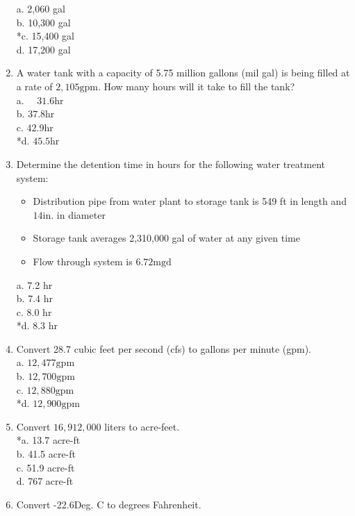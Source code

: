 \begin{enumerate}
a. 2,060 gal\\
b. 10,300 gal\\
*c. 15,400 gal\\
d. 17,200 gal\\
\item A water tank with a capacity of 5.75 million gallons (mil gal) is being filled at a rate of $2,105 \mathrm{gpm}$. How many hours will it take to fill the tank?\\
a. $\quad 31.6 \mathrm{hr}$\\
b. $37.8 \mathrm{hr}$\\
c. $42.9 \mathrm{hr}$\\
*d. $45.5 \mathrm{hr}$\\
\item Determine the detention time in hours for the following water treatment system:\\
\begin{itemize}
\item Distribution pipe from water plant to storage tank is 549 ft in length and $14 \mathrm{in}$. in diameter\\
\item Storage tank averages 2,310,000 gal of water at any given time\\
\item Flow through system is $6.72 \mathrm{mgd}$\\
\end{itemize}
a. 7.2 hr\\
b. 7.4 hr\\
c. 8.0 hr\\
*d. 8.3 hr\\
\item Convert 28.7 cubic feet per second (cfs) to gallons per minute (gpm).\\
a. $12,477 \mathrm{gpm}$\\
b. $12,700 \mathrm{gpm}$\\
c. $12,880 \mathrm{gpm}$\\
*d. $12,900 \mathrm{gpm}$\\
\item Convert $16,912,000$ liters to acre-feet.\\
*a. 13.7 acre-ft\\
b. 41.5 acre-ft\\
c. 51.9 acre-ft\\
d. 767 acre-ft\\
\item Convert -22.6Deg. C to degrees Fahrenheit.\\

\end{enumerate}
